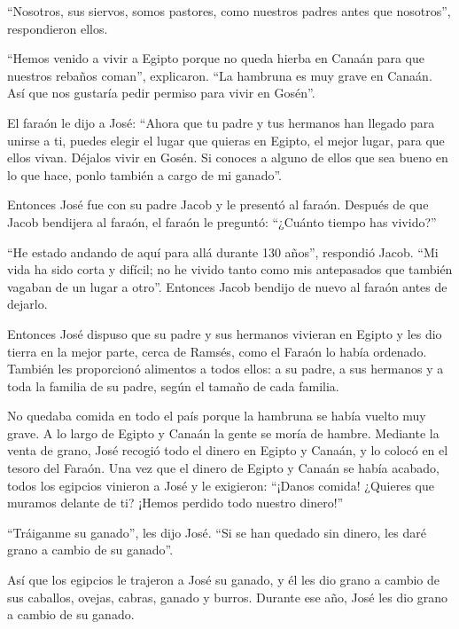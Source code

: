 ``Nosotros, sus siervos, somos pastores, como nuestros padres antes que
nosotros'', respondieron ellos.

 ``Hemos venido a vivir a Egipto porque no queda hierba en
Canaán para que nuestros rebaños coman'', explicaron. ``La hambruna es
muy grave en Canaán. Así que nos gustaría pedir permiso para vivir en
Gosén''.

 El faraón le dijo a José: ``Ahora que tu padre y tus
hermanos han llegado para unirse a ti,  puedes elegir el
lugar que quieras en Egipto, el mejor lugar, para que ellos vivan.
Déjalos vivir en Gosén. Si conoces a alguno de ellos que sea bueno en lo
que hace, ponlo también a cargo de mi ganado''.

 Entonces José fue con su padre Jacob y le presentó al
faraón. Después de que Jacob bendijera al faraón,  el faraón
le preguntó: ``¿Cuánto tiempo has vivido?''

 ``He estado andando de aquí para allá durante 130 años'',
respondió Jacob. ``Mi vida ha sido corta y difícil; no he vivido tanto
como mis antepasados que también vagaban de un lugar a otro''.
 Entonces Jacob bendijo de nuevo al faraón antes de
dejarlo.

 Entonces José dispuso que su padre y sus hermanos vivieran
en Egipto y les dio tierra en la mejor parte, cerca de Ramsés, como el
Faraón lo había ordenado.  También les proporcionó
alimentos a todos ellos: a su padre, a sus hermanos y a toda la familia
de su padre, según el tamaño de cada familia.

 No quedaba comida en todo el país porque la hambruna se
había vuelto muy grave. A lo largo de Egipto y Canaán la gente se moría
de hambre.  Mediante la venta de grano, José recogió todo
el dinero en Egipto y Canaán, y lo colocó en el tesoro del Faraón.
 Una vez que el dinero de Egipto y Canaán se había acabado,
todos los egipcios vinieron a José y le exigieron: ``¡Danos comida!
¿Quieres que muramos delante de ti? ¡Hemos perdido todo nuestro
dinero!''

 ``Tráiganme su ganado'', les dijo José. ``Si se han
quedado sin dinero, les daré grano a cambio de su ganado''.

 Así que los egipcios le trajeron a José su ganado, y él
les dio grano a cambio de sus caballos, ovejas, cabras, ganado y burros.
Durante ese año, José les dio grano a cambio de su ganado.

